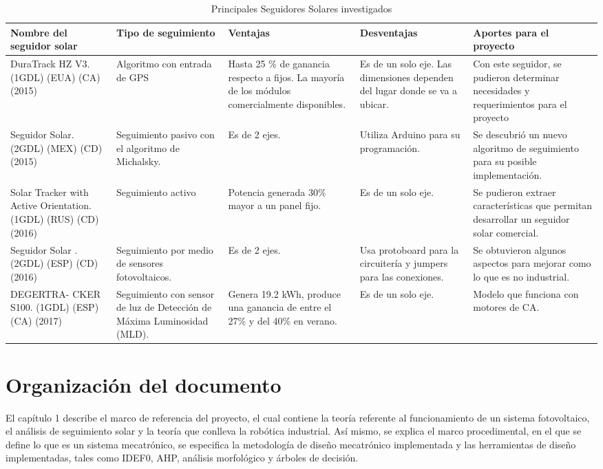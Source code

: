 \begin{table}[H]
	\centering
	\caption{Principales Seguidores Solares investigados}
	\begin{tabular}{|p{7em}|p{6em}|p{8em}|p{7em}|p{9em}|}
		\hline
		\textbf{Nombre del seguidor solar} & \textbf{Tipo de seguimiento} & \textbf{Ventajas} & \textbf{Desventajas} & \textbf{Aportes para el proyecto} \\
		\hline \hline
		DuraTrack HZ V3. \cite{I9} (1GDL) (EUA) (CA) (2015) & Algoritmo con entrada de GPS & Hasta 25 \% de ganancia respecto a fijos. La mayoría de los módulos comercialmente disponibles. & Es de un solo eje. Las dimensiones dependen del lugar donde se va a ubicar. & Con este seguidor, se pudieron determinar necesidades y requerimientos para el proyecto \\
		\hline
		Seguidor Solar. \cite{I16:2019:Online} (2GDL) (MEX) (CD) (2015) & Seguimiento pasivo con el algoritmo de Michalsky. & Es de 2 ejes. & Utiliza Arduino para su programación. & Se descubrió un nuevo algoritmo de seguimiento para su posible implementación. \\
		\hline
		Solar Tracker with Active Orientation. \cite{I6:2019:Online} (1GDL) (RUS) (CD) (2016) & Seguimiento activo & Potencia generada 30\% mayor a un panel fijo. & Es de un solo eje. & Se pudieron extraer características que permitan desarrollar un seguidor solar comercial. \\
		\hline
		Seguidor Solar \cite{I17}. (2GDL) (ESP) (CD) (2016) & Seguimiento por medio de sensores fotovoltaicos. & Es de 2 ejes. & Usa protoboard para la circuitería y jumpers para las conexiones. & Se obtuvieron algunos aspectos para mejorar como lo que es no industrial. \\
		\hline
		DEGERTRA- CKER S100. \cite{I10} (1GDL) (ESP) (CA) (2017) & Seguimiento con sensor de luz de Detección de Máxima Luminosidad (MLD). & Genera 19.2 kWh, produce una ganancia de entre el 27\% y del 40\% en verano. & Es de un solo eje. & Modelo que funciona con motores de CA. \\
		\hline
	\end{tabular}%
	\label{tab:antecedentes}%
\end{table}%
\section{Organización del documento}    %
El capítulo 1 describe el marco de referencia del proyecto, el cual contiene la teoría referente al funcionamiento de un sistema fotovoltaico, el análisis de seguimiento solar y la teoría que conlleva la robótica industrial. Así mismo, se explica el marco procedimental, en el que se define lo que es un sistema mecatrónico, se especifica la metodología de diseño mecatrónico implementada y las herramientas de diseño implementadas, tales como IDEF0, AHP, análisis morfológico y árboles de decisión.\\

